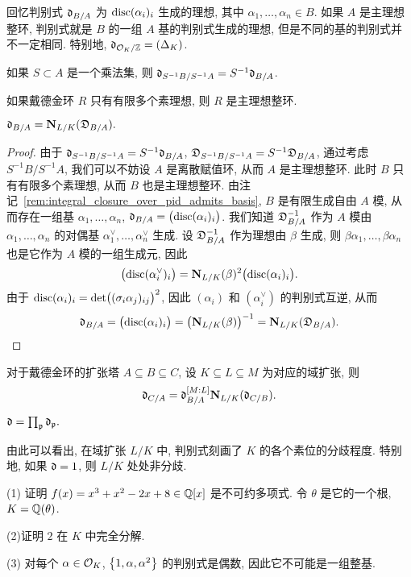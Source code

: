回忆判别式 ${\mathfrak{d}}_{B/A}$ 为 ${\mathrm{disc}}(\alpha_i)_i$ 生成的理想, 其中 $\alpha_1,\dots,\alpha_n\in B$. 如果 $A$ 是主理想整环, 判别式就是 $B$ 的一组 $A$ 基的判别式生成的理想, 但是不同的基的判别式并不一定相同. 特别地, ${\mathfrak{d}}_{{\mathcal{O}}_K/{\mathbb{Z}}}=(\Delta_K)$. 

\begin{exercise}
如果 $S\subset A$ 是一个乘法集, 则 ${\mathfrak{d}}_{S^{-1}B/S^{-1}A}=S^{-1}{\mathfrak{d}}_{B/A}$.
\end{exercise}

\begin{exercise}
如果戴德金环 $R$ 只有有限多个素理想, 则 $R$ 是主理想整环.
\end{exercise}

\begin{theorem}{}{}
${\mathfrak{d}}_{B/A}={\mathbf{N}}_{L/K}({\mathfrak{D}}_{B/A}).$
\end{theorem}
\begin{proof}
由于 ${\mathfrak{d}}_{S^{-1}B/S^{-1}A}=S^{-1}{\mathfrak{d}}_{B/A}$, ${\mathfrak{D}}_{S^{-1}B/S^{-1}A}=S^{-1}{\mathfrak{D}}_{B/A}$, 通过考虑 $S^{-1}B/S^{-1}A$, 我们可以不妨设 $A$ 是离散赋值环, 从而 $A$ 是主理想整环. 此时 $B$ 只有有限多个素理想, 从而 $B$ 也是主理想整环. 由注记~\ref{rem:integral_closure_over_pid_admits_basis}, $B$ 是有限生成自由 $A$ 模, 从而存在一组基 $\alpha_1,\dots,\alpha_n$, ${\mathfrak{d}}_{B/A}=\bigl({\mathrm{disc}}(\alpha_i)_i\bigr)$. 我们知道 ${\mathfrak{D}}^{-1}_{B/A}$ 作为 $A$ 模由 $\alpha_1,\dots,\alpha_n$ 的对偶基 $\alpha_1^\vee,\dots,\alpha_n^\vee$ 生成. 设 ${\mathfrak{D}}^{-1}_{B/A}$ 
 作为理想由 $\beta$ 生成, 则 $\beta\alpha_1,\dots,\beta\alpha_n$ 也是它作为 $A$ 模的一组生成元, 因此
  \[\bigl({\mathrm{disc}}(\alpha_i^\vee)_i\bigr)={\mathbf{N}}_{L/K}(\beta)^2\bigl({\mathrm{disc}}(\alpha_i)_i\bigr).\]
由于 ${\mathrm{disc}}(\alpha_i)_i=\det\bigl((\sigma_i\alpha_j)_{ij}\bigr)^2$, 因此 $(\alpha_i)$ 和 $(\alpha_i^\vee)$ 的判别式互逆, 从而
  \[{\mathfrak{d}}_{B/A}=\bigl({\mathrm{disc}}(\alpha_i)_i\bigr)=\bigl({\mathbf{N}}_{L/K}(\beta)\bigr)^{-1}={\mathbf{N}}_{L/K}({\mathfrak{D}}_{B/A}).\]
\end{proof}

\begin{corollary}{}{}
对于戴德金环的扩张塔 $A\subseteq B\subseteq C$, 设 $K\subseteq L\subseteq M$ 为对应的域扩张, 则
  \[{\mathfrak{d}}_{C/A}={\mathfrak{d}}_{B/A}^{[M:L]} {\mathbf{N}}_{L/K}({\mathfrak{d}}_{C/B}).\]
\end{corollary}
\begin{corollary}{}{}
${\mathfrak{d}}=\prod_{\mathfrak{p}} {\mathfrak{d}}_{{\mathfrak{p}}}.$
\end{corollary}

由此可以看出, 在域扩张 $L/K$ 中, 判别式刻画了 $K$ 的各个素位的分歧程度. 特别地, 如果 ${\mathfrak{d}}=1$, 则 $L/K$ 处处非分歧.

\begin{exercise}
(1) 证明 $f(x)=x^3+x^2-2x+8\in{\mathbb{Q}}[x]$ 是不可约多项式. 令 $\theta$ 是它的一个根, $K={\mathbb{Q}}(\theta)$.

(2)证明 $2$ 在 $K$ 中完全分解.

(3) 对每个 $\alpha\in{\mathcal{O}}_K$, $\left\{1,\alpha,\alpha^2\right\}$ 的判别式是偶数, 因此它不可能是一组整基.
\end{exercise}

